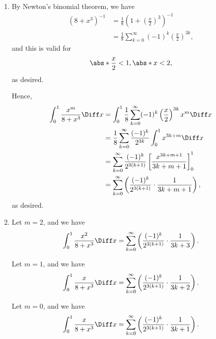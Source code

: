 \Question{\currfilebase}
\begin{enumerate}
    \item By Newton's binomial theorem, we have
          \begin{align*}
              (8 + x^3)^{-1} & = \frac{1}{8} \left(1 + \left(\frac{x}{2}\right)^3\right)^{-1}            \\
                             & = \frac{1}{8} \sum_{k = 0}^{\infty} (-1)^k \left(\frac{x}{2}\right)^{3k},
          \end{align*}
          and this is valid for
          \[
              \abs*{\frac{x}{2}} < 1, \abs*{x} < 2,
          \]
          as desired.

          Hence,
          \begin{align*}
              \int_{0}^{1} \frac{x^m}{8 + x^3} \Diff x & = \int_{0}^{1} \frac{1}{8} \sum_{k = 0}^{\infty} (-1)^k \left(\frac{x}{2}\right)^{3k} x^m \Diff x          \\
                                                       & = \frac{1}{8} \sum_{k = 0}^{\infty} \frac{(-1)^k}{2^{3k}} \int_{0}^{1} x^{3k + m} \Diff x                  \\
                                                       & = \sum_{k = 0}^{\infty} \frac{(-1)^k}{2^{3(k + 1)}} \left[\frac{x^{3k + m + 1}}{3k + m + 1}\right]_{0}^{1} \\
                                                       & = \sum_{k = 0}^{\infty} \left(\frac{(-1)^k}{2^{3(k + 1)}} \cdot \frac{1}{3k + m + 1}\right),
          \end{align*}
          as desired.

    \item Let \(m = 2\), and we have
          \[
              \int_{0}^{1} \frac{x^2}{8 + x^3} \Diff x = \sum_{k = 0}^{\infty} \left(\frac{(-1)^k}{2^{3(k + 1)}} \cdot \frac{1}{3k + 3}\right).
          \]

          Let \(m = 1\), and we have
          \[
              \int_{0}^{1} \frac{x}{8 + x^3} \Diff x = \sum_{k = 0}^{\infty} \left(\frac{(-1)^k}{2^{3(k + 1)}} \cdot \frac{1}{3k + 2}\right).
          \]


          Let \(m = 0\), and we have
          \[
              \int_{0}^{1} \frac{x}{8 + x^3} \Diff x = \sum_{k = 0}^{\infty} \left(\frac{(-1)^k}{2^{3(k + 1)}} \cdot \frac{1}{3k + 1}\right).
          \]


\end{enumerate}
